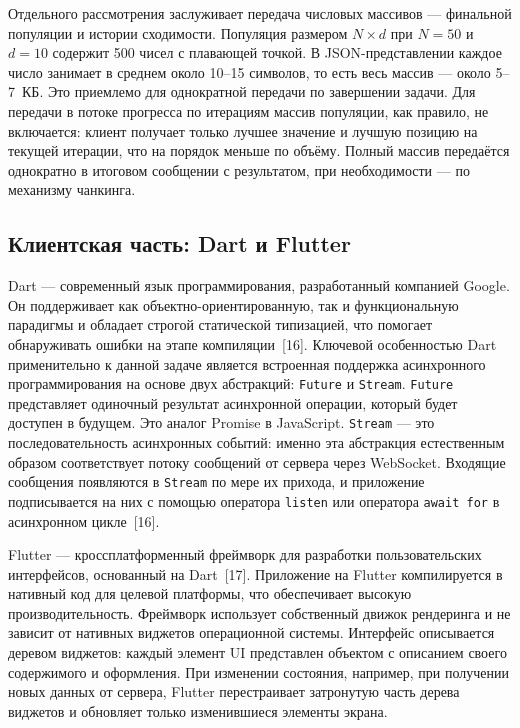 \documentclass[14pt, russian]{scrartcl}
\begin{document}
Отдельного рассмотрения заслуживает передача числовых массивов ---
финальной популяции и истории сходимости. Популяция размером $N \times d$
при $N = 50$ и $d = 10$ содержит 500 чисел с плавающей точкой.
В JSON-представлении каждое число занимает в среднем около 10--15
символов, то есть весь массив --- около 5--7~КБ. Это приемлемо для
однократной передачи по завершении задачи. Для передачи в потоке
прогресса по итерациям массив популяции, как правило, не включается:
клиент получает только лучшее значение и лучшую позицию на текущей
итерации, что на порядок меньше по объёму. Полный массив передаётся
однократно в итоговом сообщении с результатом, при необходимости ---
по механизму чанкинга.

\subsection{Клиентская часть: Dart и Flutter}

Dart --- современный язык программирования, разработанный компанией
Google. Он поддерживает как объектно-ориентированную, так и
функциональную парадигмы и обладает строгой статической типизацией,
что помогает обнаруживать ошибки на этапе компиляции~[16]. Ключевой
особенностью Dart применительно к данной задаче является встроенная
поддержка асинхронного программирования на основе двух абстракций:
\texttt{Future} и \texttt{Stream}. \texttt{Future} представляет одиночный
результат асинхронной операции, который будет доступен в будущем. Это
аналог Promise в JavaScript. \texttt{Stream} --- это последовательность
асинхронных событий: именно эта абстракция естественным образом
соответствует потоку сообщений от сервера через WebSocket. Входящие
сообщения появляются в \texttt{Stream} по мере их прихода, и приложение
подписывается на них с помощью оператора \texttt{listen} или оператора
\texttt{await for} в асинхронном цикле~[16].

Flutter --- кроссплатформенный фреймворк для разработки пользовательских
интерфейсов, основанный на Dart~[17]. Приложение на Flutter компилируется
в нативный код для целевой платформы, что обеспечивает высокую
производительность. Фреймворк использует собственный движок рендеринга
и не зависит от нативных виджетов операционной системы. Интерфейс
описывается деревом виджетов: каждый элемент UI представлен объектом
с описанием своего содержимого и оформления. При изменении состояния, 
например, при получении новых данных от сервера, Flutter перестраивает
затронутую часть дерева виджетов и обновляет только изменившиеся
элементы экрана.
\end{document}

